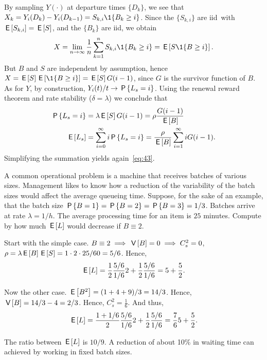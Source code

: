 By sampling $Y(\cdot)$ at departure times $\{D_k\}$, we see that  $X_k = Y_i(D_k) - Y_i(D_{k-1}) = S_{k,i} \1{B_{k} \geq i}$.
Since the $\{S_{k, i}\}$ are iid\ with $\E{S_{k,i}} = \E S$,
 and the $\{B_k\}$ are iid, we obtain
 \begin{equation*}
X = \lim_{n\to\infty} \frac{1}{n}\sum_{k=1}^n S_{k,i} \1{B_{k} \geq i} = \E{S \1{B\geq i}}.
 \end{equation*}
 But $B$ and $S$ are independent by assumption, hence $X = \E{S} \E{\1{B\geq i}} = \E S G(i-1)$, since $G$ is the survivor function of $B$.
 As for $Y$, by construction, $Y_i(t)/t \to \P{\Ls=i}$.
 Using the renewal reward theorem and rate stability ($\delta = \lambda$) we conclude that
 \begin{align*}
 \P{\Ls = i} &= \lambda \E{S} G(i-1) = \rho \frac{G(i-1)}{\E B} \\
 \E{\Ls} &= \sum_{i=0}^\infty i \P{\Ls=i} = \frac{\rho}{\E B} \sum_{i=1}^\infty i G(i-1).
\end{align*}
Simplifying  the summation yields again~\cref{eq:43}.


\begin{exercise}\label{ex:64}
 A common operational problem is a machine that receives batches of
 various sizes. Management likes to know how a reduction of the
 variability of the batch sizes would affect the average queueing time.
 Suppose, for the sake of an example, that the batch size
$\P{B=1} = \P{B=2} = \P{B=3} = 1/3$.
 Batches arrive at rate $\lambda = 1/h$.
 The average processing time for an item is $25$ minutes.
 Compute by how much  $\E\L$  would decrease if $B\equiv 2$.
\begin{solution}

 Start with the simple case.
 $B\equiv 2 \implies \V B=0 \implies C_s^2 = 0$,  $\rho=\lambda \E B \E S = 1\cdot 2 \cdot 25/60 = 5/6$. Hence,
 \begin{equation*}
 \E{\L} = \frac 12 \frac{5/6}{1/6} 2 + \frac 12 \frac{5/6}{1/6} = 5 + \frac52.
 \end{equation*}

Now the other case. $\E{B^2} = (1+4+9)/3 = 14/3$. Hence, $\V B=14/3 - 4=2/3$. Hence,
$C_s^2= \frac 16$.
And thus,
 \begin{equation*}
 \E{\L} = \frac {1+1/6}2 \frac{5/6}{1/6} 2 + \frac 12 \frac{5/6}{1/6} = \frac76 5 + \frac 52.
 \end{equation*}

 The ratio between $\E{\L}$ is $10/9$.
 A reduction of about 10\% in waiting time can achieved by working in fixed batch sizes.
\end{solution}
\end{exercise}

